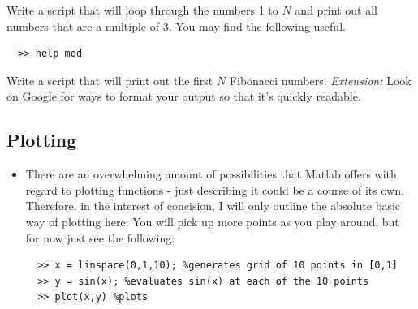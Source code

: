 \documentclass[12pt]{report}
\begin{document}
\begin{tcolorbox}[title=Task]
  Write a script that will loop through the numbers 1 to $N$ and print out all numbers that are a multiple of 3. 
  \tcblower
  You may find the following useful.
  \begin{lstlisting}
  >> help mod
  \end{lstlisting}
\end{tcolorbox}

\begin{tcolorbox}[title=Task]
  Write a script that will print out the first $N$ Fibonacci numbers.
  \tcblower
  \textit{Extension:} Look on Google for ways to format your output so that it's quickly readable.
\end{tcolorbox}


\subsection*{Plotting}
\begin{itemize}
\item There are an overwhelming amount of possibilities that Matlab offers with regard to plotting functions - just describing it could be a course of its own. Therefore, in the interest of concision, I will only outline the absolute basic way of plotting here. You will pick up more points as you play around, but for now just see the following:
\begin{lstlisting}
  >> x = linspace(0,1,10); %generates grid of 10 points in [0,1]
  >> y = sin(x); %evaluates sin(x) at each of the 10 points 
  >> plot(x,y) %plots
\end{lstlisting}
\end{itemize}
\end{document}
